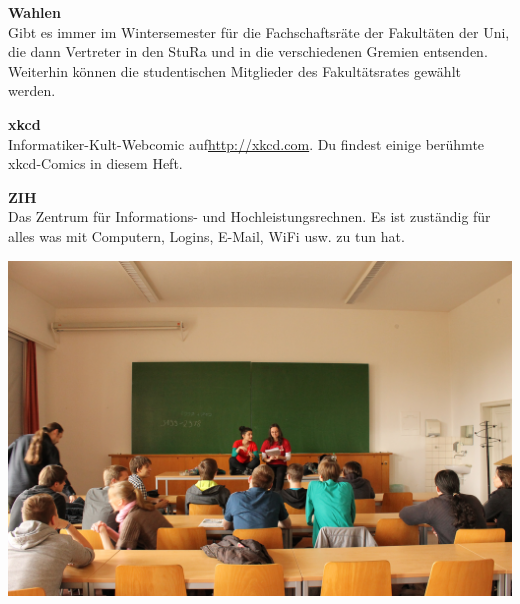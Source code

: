 \textbf{Wahlen} \\
Gibt es immer im Wintersemester für die Fachschaftsräte der Fakultäten der Uni, die dann Vertreter in den StuRa und in die verschiedenen Gremien entsenden.
Weiterhin können die studentischen Mitglieder des Fakultätsrates gewählt werden.

\textbf{xkcd} \\
Informatiker-Kult-Webcomic auf\linebreak \url{http://xkcd.com}. Du findest einige berühmte xkcd-Comics in diesem Heft.

\textbf{ZIH} \\
Das Zentrum für Informations- und Hochleistungsrechnen.
Es ist zuständig für alles was mit Computern, Logins, E-Mail, WiFi usw. zu tun hat.

\vfill
\includegraphics[width=2\linewidth]{img/ese2013/tutorium.jpg}

\onecolumn

